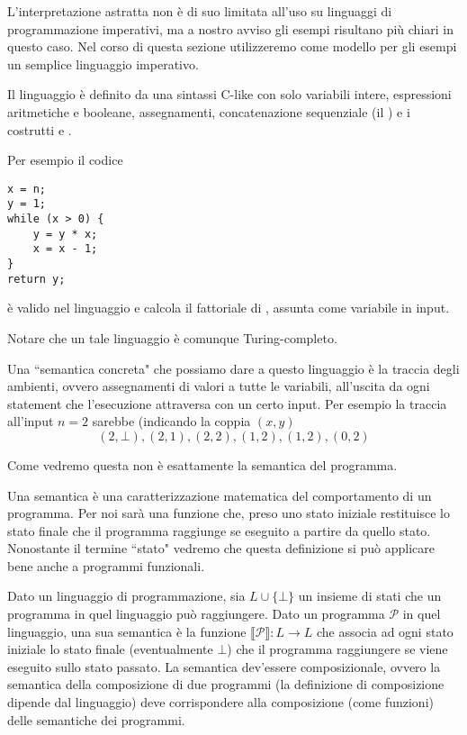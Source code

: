 \documentclass[12pt]{article}
\numberwithin{theorem}{subsection}
\begin{document}
L'interpretazione astratta non è di suo limitata all'uso su linguaggi di programmazione imperativi, ma a nostro avviso gli esempi risultano più chiari in questo caso. Nel corso di questa sezione utilizzeremo come modello per gli esempi un semplice linguaggio imperativo.
\begin{example}
	Il linguaggio è definito da una sintassi C-like con solo variabili intere, espressioni aritmetiche e booleane, assegnamenti, concatenazione sequenziale (il \code{;}) e i costrutti  e .

	Per esempio il codice
	\begin{verbatim}
x = n;
y = 1;
while (x > 0) {
	y = y * x;
	x = x - 1;
}
return y;
	\end{verbatim}
	è valido nel linguaggio e calcola il fattoriale di , assunta come variabile in input.

	Notare che un tale linguaggio è comunque Turing-completo.
	
	Una ``semantica concreta" che possiamo dare a questo linguaggio è la traccia degli ambienti, ovvero assegnamenti di valori a tutte le variabili, all'uscita da ogni statement che l'esecuzione attraversa con un certo input. Per esempio la traccia all'input $n = 2$ sarebbe (indicando la coppia $(x, y)$
	\[
	(2, \bot), (2, 1), (2, 2), (1, 2), (1, 2), (0, 2)
	\]
	
	Come vedremo questa non è esattamente la semantica del programma.
\end{example}

Una semantica è una caratterizzazione matematica del comportamento di un programma. Per noi sarà una funzione che, preso uno stato iniziale restituisce lo stato finale che il programma raggiunge se eseguito a partire da quello stato. Nonostante il termine ``stato" vedremo che questa definizione si può applicare bene anche a programmi funzionali.

\begin{definition}
	Dato un linguaggio di programmazione, sia $L \cup \{ \bot \}$ un insieme di stati che un programma in quel linguaggio può raggiungere.
	Dato un programma $\mathcal{P}$ in quel linguaggio, una sua semantica è la funzione $\llbracket \mathcal{P} \rrbracket : L \rightarrow L$ che associa ad ogni stato iniziale lo stato finale (eventualmente $\bot$) che il programma raggiungere se viene eseguito sullo stato passato.
	La semantica dev'essere composizionale, ovvero la semantica della composizione di due programmi (la definizione di composizione dipende dal linguaggio) deve corrispondere alla composizione (come funzioni) delle semantiche dei programmi.
\end{definition}
\end{document}
